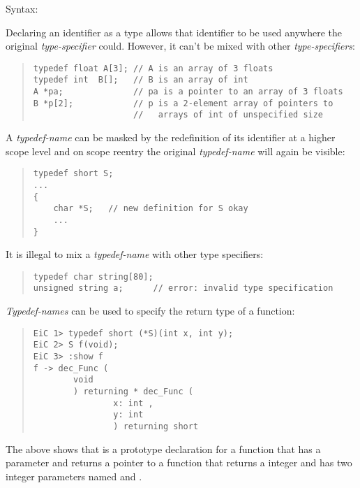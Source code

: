 Syntax:

\begin{quote}
\end{quote}

Declaring an identifier as a type allows that identifier to be used
anywhere the original {\it type-specifier} could. However, it can't be
mixed with other {\it type-specifiers}:

\begin{quote}
\begin{verbatim}
typedef float A[3]; // A is an array of 3 floats
typedef int  B[];   // B is an array of int
A *pa;              // pa is a pointer to an array of 3 floats
B *p[2];            // p is a 2-element array of pointers to
                    //   arrays of int of unspecified size
\end{verbatim}
\end{quote}

A {\it typedef-name} can be masked by the redefinition of its 
identifier at a higher scope level and on scope reentry the original
{\it typedef-name} will again be visible:
\begin{quote}
\begin{verbatim}
typedef short S;
...
{
    char *S;   // new definition for S okay
    ...
}
\end{verbatim}
\end{quote}

It is illegal to mix a {\it typedef-name} with other type specifiers:
\begin{quote}
\begin{verbatim}
typedef char string[80];
unsigned string a;      // error: invalid type specification
\end{verbatim}
\end{quote}

{\it Typedef-names} can be used to specify the return type of
a function:
\begin{quote}
\begin{verbatim}
EiC 1> typedef short (*S)(int x, int y);  
EiC 2> S f(void);
EiC 3> :show f
f -> dec_Func (
        void 
        ) returning * dec_Func (
                x: int ,
                y: int 
                ) returning short 
\end{verbatim}
\end{quote}

The above shows that  is a prototype declaration for a function
that has a  parameter and returns a pointer to a function that
returns a  integer and has two integer parameters named 
and .


